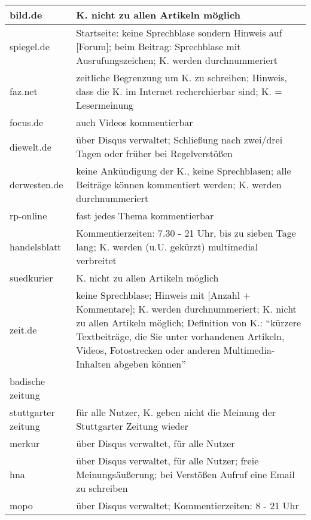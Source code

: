 \begin{landscape}
\begin{longtable}{l|p{170mm}}
\hline
bild.de			& K. nicht zu allen Artikeln möglich \\\hline
spiegel.de		& Startseite: keine Sprechblase sondern Hinweis auf [Forum]; beim Beitrag: Sprechblase mit Ausrufungszeichen; K. werden durchnummeriert \\\hline
faz.net			& zeitliche Begrenzung um K. zu schreiben; Hinweis, dass die K. im Internet recherchierbar sind; K. = Lesermeinung \\\hline
focus.de		& auch Videos kommentierbar \\\hline
diewelt.de		& über Disqus verwaltet; Schließung nach zwei/drei Tagen oder früher bei Regelverstößen \\\hline
derwesten.de		& keine Ankündigung der K., keine Sprechblasen; alle Beiträge können kommentiert werden; K. werden durchnummeriert \\\hline
rp-online		& fast jedes Thema kommentierbar \\\hline
handelsblatt		& Kommentierzeiten: 7.30 - 21 Uhr, bis zu sieben Tage lang; K. werden (u.U. gekürzt) multimedial verbreitet \\\hline
suedkurier		& K. nicht zu allen Artikeln möglich \\\hline
zeit.de			& keine Sprechblase; Hinweis mit  [Anzahl + Kommentare]; K. werden durchnummeriert;  K. nicht zu allen Artikeln möglich; Definition von K.: ``kürzere Textbeiträge, die Sie unter vorhandenen Artikeln, Videos, Fotostrecken oder anderen Multimedia-Inhalten abgeben können'' \\\hline
badische zeitung	& \\\hline
stuttgarter zeitung	& für alle Nutzer, K. geben nicht die Meinung der Stuttgarter Zeitung wieder\\\hline
merkur			& über Disqus verwaltet, für alle Nutzer\\\hline
hna			& über Disqus verwaltet, für alle Nutzer; freie Meinungsäußerung; bei Verstößen Aufruf eine Email zu schreiben \\\hline
mopo			& über Disqus verwaltet; Kommentierzeiten: 8 - 21 Uhr\\\hline

\end{longtable}
\end{landscape}
